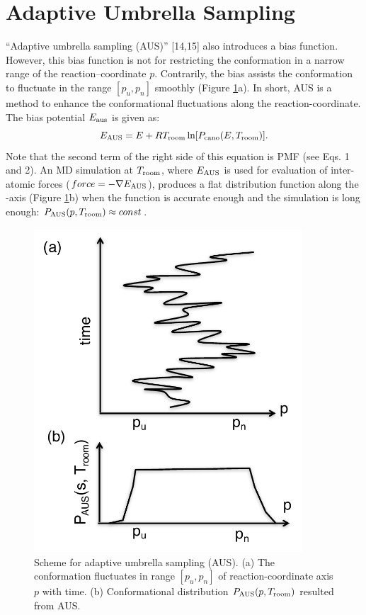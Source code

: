 \section{Adaptive Umbrella Sampling}
“Adaptive umbrella sampling (AUS)” [14,15] also introduces a bias function. However, this bias function is not for restricting the conformation in a narrow range of the reaction–coordinate $p$. Contrarily, the bias assists the conformation to fluctuate in the range $[p_u, p_n]$ smoothly (Figure \ref{fig:dist_for_aus.pdf}a). In short, AUS is a method to enhance the conformational fluctuations along the reaction-coordinate. The bias potential $E_{\rm aus}$ is given as:
\begin{equation}
E_{\rm AUS} = E + RT_{\rm room} \ln [P_{\rm cano}(E,T_{\rm room})].
\label{eq:e_aus}
\end{equation}
Note that the second term of the right side of this equation is PMF (see Eqs. 1 and 2). An MD simulation at $T_{\rm room}$, where $E_{\rm AUS}$ is used for evaluation of inter-atomic forces ($force=-\nabla E_{\rm AUS}$), produces a flat distribution function  along the -axis (Figure \ref{fig:dist_for_aus.pdf}b) when the function  is accurate enough and the simulation is long enough: $P_{\rm AUS}(p,T_{\rm room}) \approx const$.
\begin{figure}
  \centering
  \includegraphics[width=10cm]{../enhance_rev/figures/dist_for_aus.pdf}
  \caption{\label{fig:dist_for_aus.pdf} Scheme for adaptive umbrella sampling (AUS). (a) The conformation fluctuates in range $[p_u, p_n]$ of reaction-coordinate axis $p$ with time. (b) Conformational distribution $P_{\rm AUS} (p ,T_{\rm room})$ resulted from AUS.}
\end{figure}


